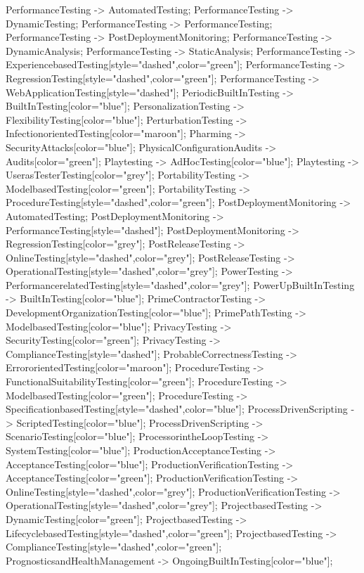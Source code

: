 \documentclass{article}
\begin{document}
{PerformanceTesting -> AutomatedTesting;
PerformanceTesting -> DynamicTesting;
PerformanceTesting -> PerformanceTesting;
PerformanceTesting -> PostDeploymentMonitoring;
PerformanceTesting -> DynamicAnalysis;
PerformanceTesting -> StaticAnalysis;
PerformanceTesting -> ExperiencebasedTesting[style="dashed",color="green"];
PerformanceTesting -> RegressionTesting[style="dashed",color="green"];
PerformanceTesting -> WebApplicationTesting[style="dashed"];
PeriodicBuiltInTesting -> BuiltInTesting[color="blue"];
PersonalizationTesting -> FlexibilityTesting[color="blue"];
PerturbationTesting -> InfectionorientedTesting[color="maroon"];
Pharming -> SecurityAttacks[color="blue"];
PhysicalConfigurationAudits -> Audits[color="green"];
Playtesting -> AdHocTesting[color="blue"];
Playtesting -> UserasTesterTesting[color="grey"];
PortabilityTesting -> ModelbasedTesting[color="green"];
PortabilityTesting -> ProcedureTesting[style="dashed",color="green"];
PostDeploymentMonitoring -> AutomatedTesting;
PostDeploymentMonitoring -> PerformanceTesting[style="dashed"];
PostDeploymentMonitoring -> RegressionTesting[color="grey"];
PostReleaseTesting -> OnlineTesting[style="dashed",color="grey"];
PostReleaseTesting -> OperationalTesting[style="dashed",color="grey"];
PowerTesting -> PerformancerelatedTesting[style="dashed",color="grey"];
PowerUpBuiltInTesting -> BuiltInTesting[color="blue"];
PrimeContractorTesting -> DevelopmentOrganizationTesting[color="blue"];
PrimePathTesting -> ModelbasedTesting[color="blue"];
PrivacyTesting -> SecurityTesting[color="green"];
PrivacyTesting -> ComplianceTesting[style="dashed"];
ProbableCorrectnessTesting -> ErrororientedTesting[color="maroon"];
ProcedureTesting -> FunctionalSuitabilityTesting[color="green"];
ProcedureTesting -> ModelbasedTesting[color="green"];
ProcedureTesting -> SpecificationbasedTesting[style="dashed",color="blue"];
ProcessDrivenScripting -> ScriptedTesting[color="blue"];
ProcessDrivenScripting -> ScenarioTesting[color="blue"];
ProcessorintheLoopTesting -> SystemTesting[color="blue"];
ProductionAcceptanceTesting -> AcceptanceTesting[color="blue"];
ProductionVerificationTesting -> AcceptanceTesting[color="green"];
ProductionVerificationTesting -> OnlineTesting[style="dashed",color="grey"];
ProductionVerificationTesting -> OperationalTesting[style="dashed",color="grey"];
ProjectbasedTesting -> DynamicTesting[color="green"];
ProjectbasedTesting -> LifecyclebasedTesting[style="dashed",color="green"];
ProjectbasedTesting -> ComplianceTesting[style="dashed",color="green"];
PrognosticsandHealthManagement -> OngoingBuiltInTesting[color="blue"];
}
\end{document}
